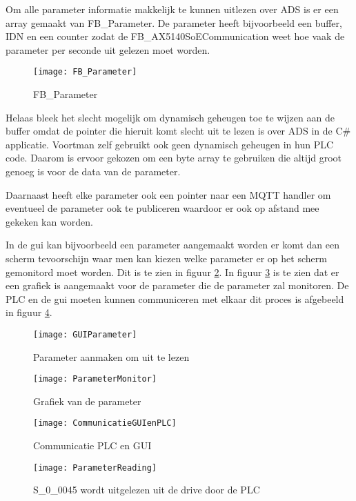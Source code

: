 Om alle parameter informatie makkelijk te kunnen uitlezen over \gls{ADS} is er een array gemaakt van FB\_Parameter. De parameter heeft bijvoorbeeld een buffer, \gls{IDN} en een counter zodat de FB\_AX5140SoECommunication weet hoe vaak de parameter per seconde uit gelezen moet worden.

\begin{figure}[H]
	\centering
	\texttt{[image: FB\_Parameter]}
	\label{fig:FB_Parameter}
	\caption{FB\_Parameter}
\end{figure}

Helaas bleek het slecht mogelijk om dynamisch geheugen toe te wijzen aan de buffer omdat de pointer die hieruit komt slecht uit te lezen is over \gls{ADS} in de C\# applicatie. Voortman zelf gebruikt ook geen dynamisch geheugen in hun \gls{PLC} code. Daarom is ervoor gekozen om een byte array te gebruiken die altijd groot genoeg is voor de data van de parameter.

\vspace{0.5cm}

Daarnaast heeft elke parameter ook een pointer naar een \gls{MQTT} handler om eventueel de parameter ook te publiceren waardoor er ook op afstand mee gekeken kan worden.

\vspace{0.5cm}

In de \gls{gui} kan bijvoorbeeld een parameter aangemaakt worden er komt dan een scherm tevoorschijn waar men kan kiezen welke parameter er op het scherm gemonitord moet worden. Dit is te zien in figuur \ref{fig:GUIParameter}. In figuur \ref{fig:ParameterMonitor} is te zien dat er een grafiek is aangemaakt voor de parameter die de parameter zal monitoren. De \gls{PLC} en de \gls{gui} moeten kunnen communiceren met elkaar dit proces is afgebeeld in figuur \ref{fig:CommunicatieGUIenPLC}.

\begin{figure}[H]
	\centering
	\texttt{[image: GUIParameter]}
	\label{fig:GUIParameter}
	\caption{Parameter aanmaken om uit te lezen}
\end{figure}

\begin{figure}[H]
	\centering
	\texttt{[image: ParameterMonitor]}
	\label{fig:ParameterMonitor}
	\caption{Grafiek van de parameter}
\end{figure}

\begin{figure}[H]
	\centering
	\texttt{[image: CommunicatieGUIenPLC]}
	\label{fig:CommunicatieGUIenPLC}
	\caption{Communicatie PLC en GUI}
\end{figure}

\begin{figure}[H]
	\centering
	\texttt{[image: ParameterReading]}
	\label{fig:ParameterRead}
	\caption{S\_0\_0045 wordt uitgelezen uit de drive door de \gls{PLC}}
\end{figure}

